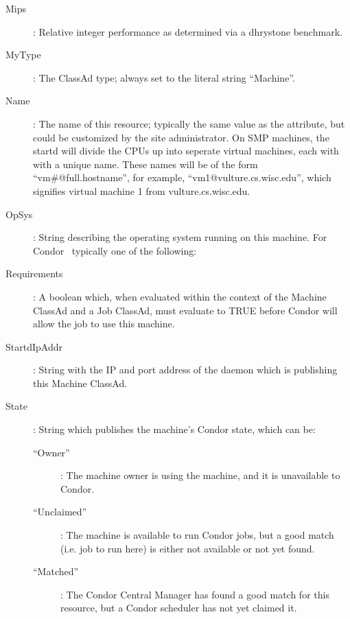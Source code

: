 \begin{description}
%
\item[Mips] : Relative integer performance as determined via a dhrystone
benchmark.
%
\item[MyType] : The ClassAd type; always set to the literal string ``Machine''.
%
\item[Name] : The name of this resource; typically the same value as
the  attribute, but could be customized by the site
administrator.
On SMP machines, the startd will divide the CPUs up into seperate
virtual machines, each with with a unique name.
These names will be of the form ``vm\#@full.hostname'', for example,
``vm1@vulture.cs.wisc.edu'', which signifies virtual machine 1 from
vulture.cs.wisc.edu. 
%
\item[OpSys] : String describing the operating system running on this
machine.  For Condor \VersionNotice\ typically one of the following:
%
\item[Requirements] : A boolean which, when evaluated within the context
of the Machine ClassAd and a Job ClassAd, must evaluate to
TRUE before Condor will allow the job to use this machine.
%
\item[StartdIpAddr] : String with the IP and port address of the
 daemon which is publishing this Machine ClassAd.
%
\item[State] : String which publishes the machine's Condor state, which
can be:
	\begin{description}
	\item[``Owner''] : The machine owner is using the machine, and
it is unavailable to Condor.
	\item[``Unclaimed''] : The machine is available to run Condor jobs,
but a good match (i.e. job to run here) is either not available or not 
yet found.
	\item[``Matched''] : The Condor Central Manager has found a good
match for this resource, but a Condor scheduler has not yet claimed it.

\end{description}
\end{description}
